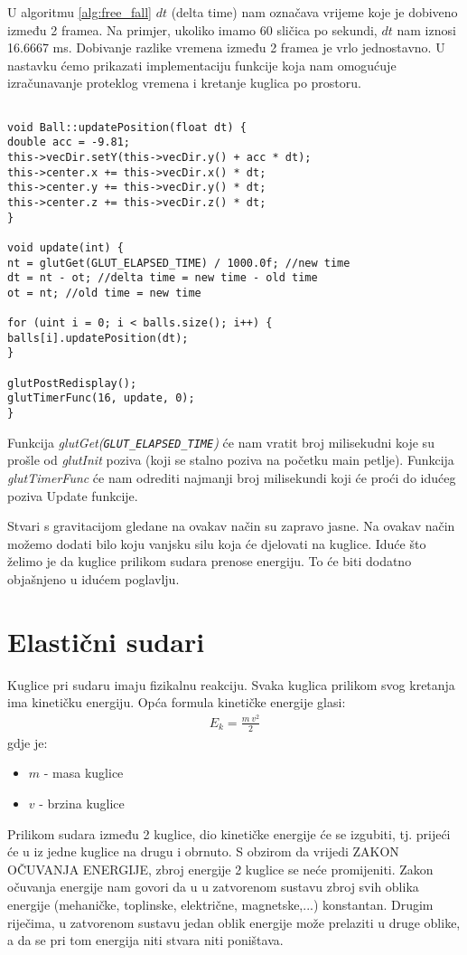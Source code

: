 U algoritmu \ref{alg:free_fall} $dt$ (delta time) nam označava vrijeme koje je dobiveno između 2 framea. Na primjer, ukoliko imamo 60 sličica po sekundi, $dt$ nam iznosi 16.6667 ms. Dobivanje razlike vremena između 2 framea je vrlo jednostavno. U nastavku ćemo prikazati implementaciju funkcije koja nam omogućuje izračunavanje proteklog vremena i kretanje kuglica po prostoru. \newpage
\begin{lstlisting}[style = myC++, label = {code:12}, caption = {Implementacije update funkcija}]

void Ball::updatePosition(float dt) {
double acc = -9.81;
this->vecDir.setY(this->vecDir.y() + acc * dt);
this->center.x += this->vecDir.x() * dt;
this->center.y += this->vecDir.y() * dt;
this->center.z += this->vecDir.z() * dt;
}

void update(int) {
nt = glutGet(GLUT_ELAPSED_TIME) / 1000.0f; //new time
dt = nt - ot; //delta time = new time - old time
ot = nt; //old time = new time

for (uint i = 0; i < balls.size(); i++) {
balls[i].updatePosition(dt);
}

glutPostRedisplay();
glutTimerFunc(16, update, 0);
}
\end{lstlisting}

Funkcija \emph{glutGet(\texttt{GLUT\_ELAPSED\_TIME})} će nam vratit broj milisekudni koje su prošle od \emph{glutInit} poziva (koji se stalno poziva na početku main petlje). Funkcija \emph{glutTimerFunc} će nam odrediti najmanji broj milisekundi koji će proći do idućeg poziva Update funkcije.

Stvari s gravitacijom gledane na ovakav način su zapravo jasne. Na ovakav način možemo dodati bilo koju vanjsku silu koja će djelovati na kuglice. Iduće što želimo je da kuglice prilikom sudara prenose energiju. To će biti dodatno objašnjeno u idućem poglavlju.\newpage
\section{Elastični sudari}
Kuglice pri sudaru imaju fizikalnu reakciju. Svaka kuglica prilikom svog kretanja ima kinetičku energiju. Opća formula kinetičke energije glasi:
\begin{equation}\label{equ:kinetic}
	\begin{aligned}
	E_{k} = \frac{m \ v^2}{2}
	\end{aligned}
\end{equation}
gdje je:
\begin{itemize}
	\item $m$ - masa kuglice 
	\item $v$ - brzina kuglice
\end{itemize}
Prilikom sudara između 2 kuglice, dio kinetičke energije će se izgubiti, tj. prijeći će u iz jedne kuglice na drugu i obrnuto. S obzirom da vrijedi ZAKON OČUVANJA ENERGIJE, zbroj energije 2 kuglice se neće promijeniti. Zakon očuvanja energije nam govori da u u zatvorenom sustavu zbroj svih oblika energije (mehaničke, toplinske, električne, magnetske,...) konstantan. Drugim riječima, u zatvorenom sustavu jedan oblik energije može prelaziti u druge oblike, a da se pri tom energija niti stvara niti poništava\cite{11}.

